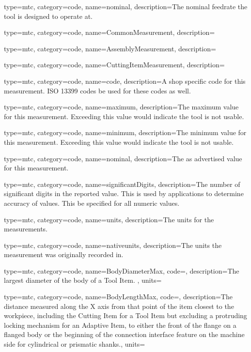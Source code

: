 {
  type=mtc,
  category=code,
  name={nominal},
  description={The nominal feedrate the tool is designed to operate at.}
}

{
  type=mtc,
  category=code,
  name={CommonMeasurement},
  description={}
}

{
  type=mtc,
  category=code,
  name={AssemblyMeasurement},
  description={}
}

{
  type=mtc,
  category=code,
  name={CuttingItemMeasurement},
  description={}
}

{
  type=mtc,
  category=code,
  name={code},
  description={A shop specific code for this measurement. ISO 13399 codes \MAY be used for these codes as well.
}
}

{
  type=mtc,
  category=code,
  name={maximum},
  description={The maximum value for this measurement. Exceeding this value would indicate the tool is not usable.}
}

{
  type=mtc,
  category=code,
  name={minimum},
  description={The minimum value for this measurement. Exceeding this value would indicate the tool is not usable.}
}

{
  type=mtc,
  category=code,
  name={nominal},
  description={The as advertised value for this measurement.}
}

{
  type=mtc,
  category=code,
  name={significantDigits},
  description={The number of significant digits in the reported value. This is used by applications to determine accuracy of values. This \MAY be specified for all numeric values.
}
}

{
  type=mtc,
  category=code,
  name={units},
  description={The units for the measurements. }
}

{
  type=mtc,
  category=code,
  name={nativeunits},
  description={The units the measurement was originally recorded in. }
}

{
  type=mtc,
  category=code,
  name={BodyDiameterMax},
  code=,
  description={The largest diameter of the body of a Tool Item. },
  units=
}

{
  type=mtc,
  category=code,
  name={BodyLengthMax},
  code=,
  description={The distance measured along the X axis from that point of the item closest to the workpiece, including the Cutting Item for a Tool Item but excluding a protruding locking mechanism for an Adaptive Item, to either the front of the flange on a flanged body or the beginning of the connection interface feature on the machine side for cylindrical or prismatic shanks.},
  units=
}

